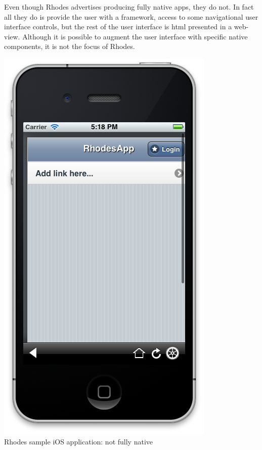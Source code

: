 Even though Rhodes advertises producing fully native apps\cite{RhoMobile}, they do not. In fact all they do is provide the user with a framework, access to some navigational user interface controls, but the rest of the user interface is html presented in a web-view. Although it is possible to augment the user interface with specific native components, it is not the focus of Rhodes. 
\begin{centering}
	\includegraphics[scale=0.3]{images/rhodes_notsonative.png}\\{Rhodes sample iOS application: not fully native}\\
\end{centering}

